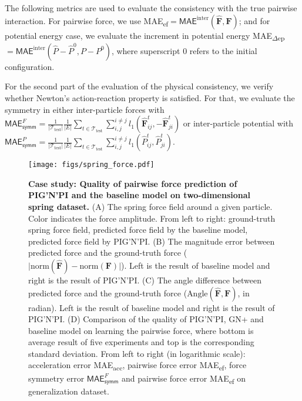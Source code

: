 \documentclass{article}
\newcommand{\abs}[1]{\lvert #1 \rvert}
\newcommand{\pignpi}{PIG'N'PI\xspace}
\newcommand{\lemos}{GN+\xspace}
\begin{document}
The following metrics are used to evaluate the consistency with the true pairwise interaction.
For pairwise force, we use \textsf{MAE\textsubscript{ef}}$= \textsf{MAE}^{\mathrm{inter}}(\bm{\hat{F}},\bm{F})$;
and for potential energy case, we evaluate the increment in potential energy \textsf{MAE\textsubscript{$\Delta$ep} }  $= \textsf{MAE}^\mathrm{inter} (\hat{P}-\hat{P}^0, P-P^0)$, 
where superscript $0$ refers to the initial configuration.

For the second part of the evaluation of the physical consistency, we verify whether Newton's action-reaction property is satisfied. For that, we evaluate the symmetry in either inter-particle forces with
$\textsf{MAE}_\textsf{symm}^{F}= \frac{1}{|\mathcal{T}_{\text{test}}|} \frac{1}{|E|}  \sum_{t\in \mathcal{T}_{\text{test}}}\sum_{i,j}^{i\neq j} l_1(\bm{\hat{F}}_{ij}^t, - \bm{\hat{F}}_{ji}^t)$
or inter-particle potential with 
$\textsf{MAE}_\textsf{symm}^{P}= \frac{1}{|\mathcal{T}_{\text{test}}|} \frac{1}{|E|}  \sum_{t\in \mathcal{T}_{\text{test}}}\sum_{i,j}^{i\neq j} l_1(\hat{P}_{ij}^t, \hat{P}_{ji}^t)$.



\begin{figure}[t!]
    \centering
    \texttt{[image: figs/spring\_force.pdf]}
    \caption{\textbf{Case study: Quality of pairwise force prediction of \pignpi and the baseline model on two-dimensional spring dataset. } (A) The spring force field around a given particle. Color indicates the force amplitude. From left to right: ground-truth spring force field, predicted force field by the baseline model, predicted force field by \pignpi. (B) The magnitude error between predicted force and the ground-truth force ($\abs{\text{norm}(\bm{\hat{F}})-\text{norm}(\bm{F})}$). Left is the result of baseline model and right is the result of \pignpi. (C) The angle difference between  predicted force and the ground-truth force ($\text{Angle}(\bm{\hat{F}}, \bm{F})$, in radian). Left is the result of baseline model and right is the result of \pignpi.  (D) Comparison of the quality of \pignpi, \lemos and baseline model on learning the pairwise force, where bottom is average result of five experiments and top is the corresponding standard deviation. From left to right (in logarithmic scale): acceleration error \textsf{MAE\textsubscript{acc}}, pairwise force error \textsf{MAE\textsubscript{ef}}, force symmetry error $\textsf{MAE}_\textsf{symm}^{F}$ and pairwise force error \textsf{MAE\textsubscript{ef}} on generalization dataset.}
    \label{fig:spring_force_results}
\end{figure}
\end{document}
